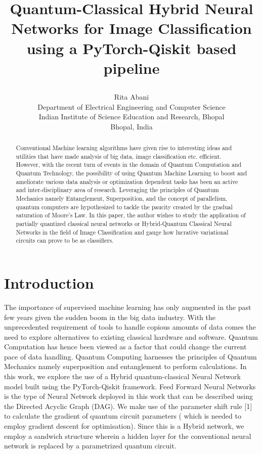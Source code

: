 \documentclass[10pt]{article}
\title{Quantum-Classical Hybrid Neural Networks for Image Classification using a PyTorch-Qiskit based pipeline


}
\author{
  Rita Abani \\
  Department of Electrical Engineering and Computer Science \\
  Indian Institute of Science Education and Research, Bhopal \\
  Bhopal, India\\
}
\begin{document}
\maketitle


\begin{abstract}
Conventional Machine learning algorithms have given rise to interesting ideas and utilities that have made analysis of big data, image classification etc. efficient. However, with the recent turn of events in the domain of Quantum Computation and Quantum Technology, the possibility of using Quantum Machine Learning to boost and ameliorate various data analysis or optimization dependent tasks has been an active and inter-disciplinary area of research. Leveraging the principles of Quantum Mechanics namely Entanglement, Superposition, and the concept of parallelism, quantum computers are hypothesized to tackle the paucity created by the gradual saturation of Moore's Law. In this paper, the author wishes to study the application of partially quantized classical neural networks or Hybrid-Quantum Classical Neural Networks in the field of Image Classification and gauge how lucrative variational circuits can prove to be as classifiers.
\end{abstract}




\section{Introduction}
The importance of supervised machine learning has only augmented in the past few years given the sudden boom in the big data industry. With the unprecedented requirement of tools to handle copious amounts of data comes the need to explore alternatives to existing classical hardware and software. Quantum Computation has hence been viewed as a factor that could change the current pace of data handling. Quantum Computing harnesses the principles of Quantum Mechanics namely superposition and entanglement to perform calculations. In this work, we explore the use of a Hybrid quantum-classical Neural Network model built using the PyTorch-Qiskit framework. Feed Forward Neural Networks is the type of Neural Network deployed in this work that can be described using the Directed Acyclic Graph (DAG). We make use of the parameter shift rule [1] to calculate the gradient of quantum circuit parameters ( which is needed to employ gradient descent for optimisation). Since this is a Hybrid network, we employ a sandwich structure wherein a hidden layer for the conventional neural network is replaced by a parametrized quantum circuit.
\end{document}
